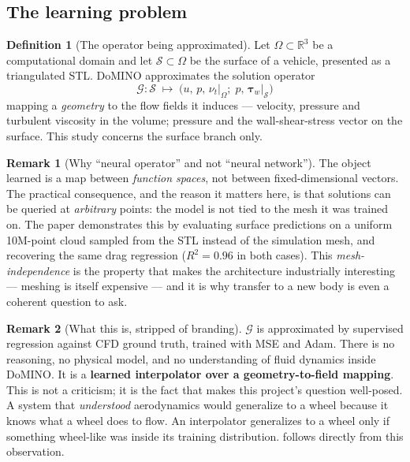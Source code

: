 \documentclass[10pt,a4paper]{article}
\theoremstyle{definition}
\newtheorem{definition}{Definition}[section]
\newtheorem{remark}{Remark}[section]
\newcommand{\R}{\mathbb{R}}
\newcommand{\calS}{\mathcal{S}}
\begin{document}
\subsection{The learning problem}

\begin{definition}[The operator being approximated]
\label{def:operator}
Let $\Omega \subset \R^3$ be a computational domain and let $\calS \subset \Omega$
be the surface of a vehicle, presented as a triangulated STL. DoMINO approximates
the solution operator
\begin{equation}
\mathcal{G}: \calS \;\longmapsto\; \bigl(u,\, p,\, \nu_t \big|_\Omega;\;
p,\, \boldsymbol{\tau}_w \big|_{\calS}\bigr)
\label{eq:operator}
\end{equation}
mapping a \emph{geometry} to the flow fields it induces --- velocity, pressure and
turbulent viscosity in the volume; pressure and the wall-shear-stress vector on the
surface. This study concerns the surface branch only.
\end{definition}

\begin{remark}[Why ``neural operator'' and not ``neural network'']
The object learned is a map between \emph{function spaces}, not between fixed-dimensional
vectors. The practical consequence, and the reason it matters here, is that solutions
can be queried at \emph{arbitrary} points: the model is not tied to the mesh it was
trained on. The paper demonstrates this by evaluating surface predictions on a
uniform 10M-point cloud sampled from the STL instead of the simulation mesh, and
recovering the same drag regression ($R^2 = 0.96$ in both cases). This
\emph{mesh-independence} is the property that makes the architecture industrially
interesting --- meshing is itself expensive --- and it is why transfer to a new body is
even a coherent question to ask.
\end{remark}

\begin{remark}[What this is, stripped of branding]
$\mathcal{G}$ is approximated by supervised regression against CFD ground truth,
trained with MSE and Adam. There is no reasoning, no physical model, and no
understanding of fluid dynamics inside DoMINO. It is a \textbf{learned interpolator
over a geometry-to-field mapping}. This is not a criticism; it is the fact that makes
this project's question well-posed. A system that \emph{understood} aerodynamics would
generalize to a wheel because it knows what a wheel does to flow. An interpolator
generalizes to a wheel only if something wheel-like was inside its training
distribution.  follows directly from this observation.
\end{remark}
\end{document}
